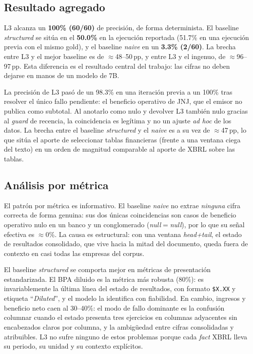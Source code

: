 \documentclass[conference]{IEEEtran}
\begin{document}
\subsection{Resultado agregado}
L3 alcanza un \textbf{100\% (60/60)} de precisión, de forma determinista.
El baseline \textit{structured} se sitúa en el \textbf{50.0\%} en la ejecución
reportada (51.7\% en una ejecución previa con el mismo gold), y el baseline
\textit{naive} en un \textbf{3.3\% (2/60)}. La brecha entre L3 y el mejor
baseline es de $\approx$48--50\,pp, y entre L3 y el ingenuo, de
$\approx$96--97\,pp. Esta diferencia es el resultado central del trabajo: las
cifras no deben dejarse en manos de un modelo de 7B.

La precisión de L3 pasó de un 98.3\% en una iteración previa a un 100\% tras
resolver el único fallo pendiente: el beneficio operativo de JNJ, que el emisor no
publica como subtotal. Al anotarlo como nulo y devolver L3 también nulo gracias al
\textit{guard} de recencia, la coincidencia es legítima y no un ajuste
\textit{ad hoc} de los datos. La brecha entre el baseline \textit{structured} y el
\textit{naive} es a su vez de $\approx$47\,pp, lo que sitúa el aporte de
seleccionar tablas financieras (frente a una ventana ciega del texto) en un orden
de magnitud comparable al aporte de XBRL sobre las tablas.

\subsection{Análisis por métrica}
El patrón por métrica es informativo. El baseline \textit{naive} no extrae
\emph{ninguna} cifra correcta de forma genuina: sus dos únicas coincidencias son
casos de beneficio operativo nulo en un banco y un conglomerado
(\textit{null}$=$\textit{null}), por lo que su señal efectiva es $\approx$0\%.
La causa es estructural: con una ventana \textit{head+tail}, el estado de
resultados consolidado, que vive hacia la mitad del documento, queda fuera de
contexto en casi todas las empresas del corpus.

El baseline \textit{structured} se comporta mejor en métricas de presentación
estandarizada. El BPA diluido es la métrica más robusta (80\%): es
invariablemente la última línea del estado de resultados, con formato
\texttt{\$X.XX} y etiqueta ``\textit{Diluted}'', y el modelo la identifica con
fiabilidad. En cambio, ingresos y beneficio neto caen al 30--40\%: el modo de
fallo dominante es la confusión columnar cuando el estado presenta tres
ejercicios en columnas adyacentes sin encabezados claros por columna, y la
ambigüedad entre cifras consolidadas y atribuibles. L3 no sufre ninguno de estos
problemas porque cada \textit{fact} XBRL lleva su periodo, su unidad y su
contexto explícitos.
\end{document}
